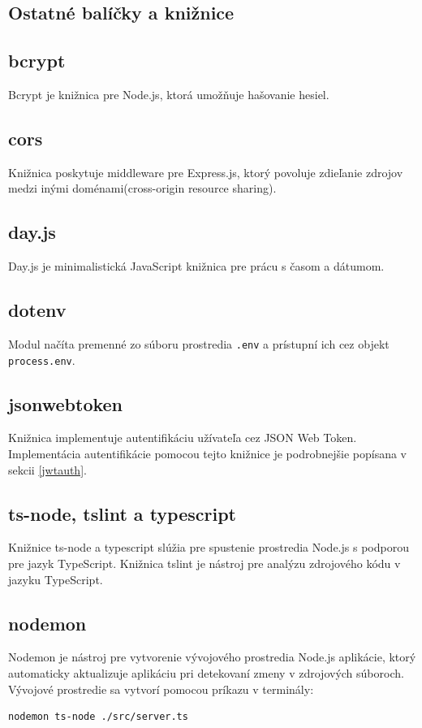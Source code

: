 \subsection{Ostatné balíčky a knižnice}
\subsection*{bcrypt}
Bcrypt je knižnica pre Node.js, ktorá umožňuje hašovanie hesiel.

\subsection*{cors}
Knižnica poskytuje middleware pre Express.js, ktorý povoluje zdieľanie zdrojov medzi inými doménami(cross-origin resource sharing).

\subsection*{day.js}
Day.js je minimalistická JavaScript knižnica pre prácu s časom a dátumom.

\subsection*{dotenv}
Modul načíta premenné zo súboru prostredia \texttt{.env} a prístupní ich cez objekt \texttt{process.env}.

\subsection*{jsonwebtoken}
Knižnica implementuje autentifikáciu užívateľa cez JSON Web Token. Implementácia autentifikácie pomocou tejto knižnice je podrobnejšie popísana v sekcii \ref{jwtauth}.

\subsection*{ts-node, tslint a typescript}
Knižnice ts-node a typescript slúžia pre spustenie prostredia Node.js s podporou pre jazyk TypeScript. Knižnica tslint je nástroj pre analýzu zdrojového kódu v jazyku TypeScript.

\subsection*{nodemon}
Nodemon je nástroj pre vytvorenie vývojového prostredia Node.js aplikácie, ktorý automaticky aktualizuje aplikáciu pri detekovaní zmeny v zdrojových súboroch. Vývojové prostredie sa vytvorí pomocou príkazu v terminály:
\begin{verbatim}nodemon ts-node ./src/server.ts
\end{verbatim}
